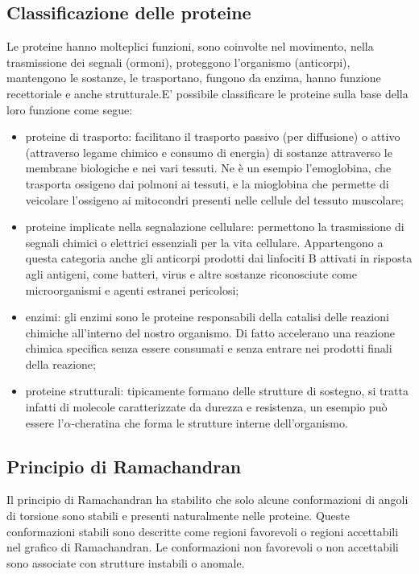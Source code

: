 \subsection{Classificazione delle proteine}\label{subsec:classificazioneproteine}
Le proteine hanno molteplici funzioni, sono coinvolte nel movimento, nella trasmissione dei segnali (ormoni), proteggono l'organismo (anticorpi), mantengono le sostanze, le trasportano, fungono da enzima, hanno funzione recettoriale e anche strutturale.E' possibile classificare le proteine sulla base della loro funzione come segue:
\vspace{10pt}
\begin{itemize}
	\item proteine di trasporto: facilitano il trasporto passivo (per diffusione) o attivo (attraverso legame chimico e consumo di energia) di sostanze attraverso le membrane biologiche e nei vari tessuti. Ne è un esempio l'emoglobina, che trasporta ossigeno dai polmoni ai tessuti, e la mioglobina che permette di veicolare l'ossigeno ai mitocondri presenti nelle cellule del tessuto muscolare;
	\vspace{5pt}
	\item proteine implicate nella segnalazione cellulare: permettono la trasmissione di segnali chimici o elettrici essenziali per la vita cellulare. Appartengono a questa categoria anche gli anticorpi prodotti  dai linfociti B attivati in risposta agli antigeni, come batteri, virus e altre sostanze riconosciute come microorganismi e agenti estranei pericolosi;
	\vspace{5pt}
	\item enzimi: gli enzimi sono le proteine responsabili della catalisi delle reazioni chimiche all'interno del nostro organismo. Di fatto accelerano una reazione chimica specifica senza essere consumati e senza entrare nei prodotti finali della reazione;
	\vspace{5pt}
	\item proteine strutturali: tipicamente formano delle strutture di sostegno, si tratta infatti di molecole caratterizzate da durezza e resistenza, un esempio può essere l'$\alpha$-cheratina che forma le strutture interne dell'organismo.
	\vspace{5pt}
\end{itemize}

\subsection{Principio di Ramachandran}\label{subsec:ramachandranPrinciple}
Il principio di Ramachandran ha stabilito che solo alcune conformazioni di angoli di torsione sono stabili e presenti naturalmente nelle proteine. Queste conformazioni stabili sono descritte come regioni favorevoli o regioni accettabili nel grafico di Ramachandran. Le conformazioni non favorevoli o non accettabili sono associate con strutture instabili o anomale.

